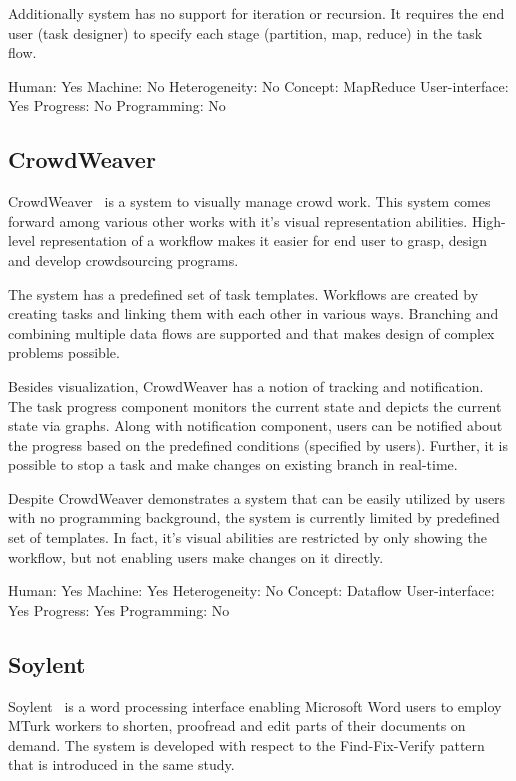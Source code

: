 Additionally system has no support for iteration or recursion. It requires the 
end user (task designer) to specify each stage (partition, map, reduce) in the task flow.

Human: Yes
Machine: No
Heterogeneity: No
Concept: MapReduce
User-interface: Yes
Progress: No
Programming: No

\subsection{CrowdWeaver}
CrowdWeaver~\cite{Kittur2012} is a system to visually manage crowd work. 
This system comes forward among various other works with it's visual representation 
abilities. High-level representation of a workflow makes it easier for end user to grasp, 
design and develop crowdsourcing programs.

The system has a predefined set of task templates. Workflows are created by 
creating tasks and linking them with each other in various ways. Branching and 
combining multiple data flows are supported and that makes design of complex 
problems possible. 

Besides visualization, CrowdWeaver has a notion of tracking and notification. 
The task progress component monitors the current state and depicts the current state
via graphs. Along with notification component, users can be notified about the 
progress based on the predefined conditions (specified by users). Further, 
it is possible to stop a task and make changes on existing branch in real-time. 

Despite CrowdWeaver demonstrates a system that can be easily utilized by users 
with no programming background, the system is currently limited by predefined set 
of templates. In fact, it's visual abilities are restricted by only showing the workflow, 
but not enabling users make changes on it directly.

Human: Yes
Machine: Yes
Heterogeneity: No
Concept: Dataflow
User-interface: Yes
Progress: Yes
Programming: No

\subsection{Soylent}
Soylent~\cite{Bernstein2010} is a word processing interface enabling Microsoft Word 
users to employ MTurk workers to shorten, proofread and edit parts of their 
documents on demand. The system is developed with respect to the 
Find-Fix-Verify pattern that is introduced in the same study.


